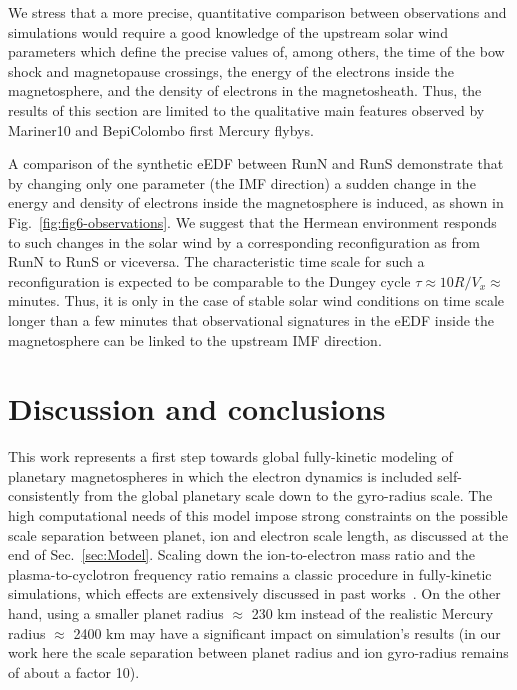 \documentclass{aa}
\begin{document}
We stress that a more precise, quantitative comparison between observations and simulations would require a good knowledge of the upstream solar wind parameters which define the precise values of, among others, the time of the bow shock and magnetopause crossings, the energy of the electrons inside the magnetosphere, and the density of electrons in the magnetosheath. Thus, the results of this section are limited to the qualitative main features observed by Mariner10 and BepiColombo first Mercury flybys.

A comparison of the synthetic eEDF between RunN and RunS demonstrate that by changing only one parameter (the IMF direction) a sudden change in the energy and density of electrons inside the magnetosphere is induced, as shown in Fig.~\ref{fig:fig6-observations}. We suggest that the Hermean environment responds to such changes in the solar wind by a corresponding reconfiguration as from RunN to RunS or viceversa. The characteristic time scale for such a reconfiguration is expected to be comparable to the Dungey cycle $\tau\approx 10 R/V_x\approx$ minutes. Thus, it is only in the case of stable solar wind conditions on time scale longer than a few minutes that observational signatures in the eEDF inside the magnetosphere can be linked to the upstream IMF direction.

\section{Discussion and conclusions}\label{sec:Sec4}

This work represents a first step towards global fully-kinetic modeling of planetary magnetospheres in which the electron dynamics is included self-consistently from the global planetary scale down to the gyro-radius scale. The high computational needs of this model impose strong constraints on the possible scale separation between planet, ion and electron scale length, as discussed at the end of Sec.~\ref{sec:Model}.
Scaling down the ion-to-electron mass ratio and the plasma-to-cyclotron frequency ratio remains a classic procedure in fully-kinetic simulations, which effects are extensively discussed in past works~\citep{Bret2010,Le2013,Lavorenti2021}.
On the other hand, using a smaller planet radius $\approx$ 230 km instead of the realistic Mercury radius $\approx$ 2400 km may have a significant impact on simulation's results (in our work here the scale separation between planet radius and ion gyro-radius remains of about a factor 10).
\end{document}
